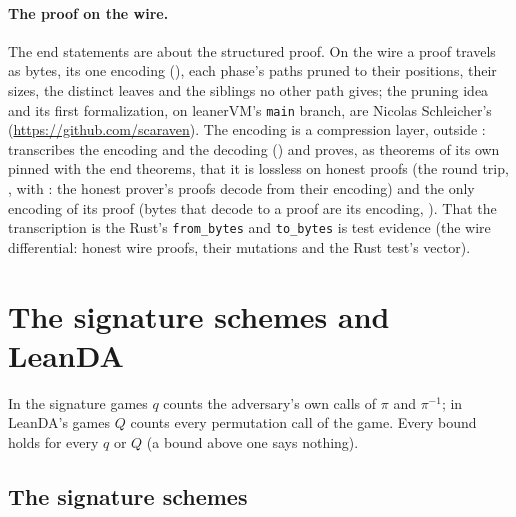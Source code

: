 \documentclass[11pt]{article}
\begin{document}
\paragraph{The proof on the wire.} The end statements are about the structured proof. On the wire
a proof travels as bytes, its one encoding (), each phase's
paths pruned to their positions, their sizes, the distinct leaves and the siblings no other path
gives; the pruning idea and its first formalization, on leanerVM's \texttt{main} branch, are
Nicolas Schleicher's (\url{https://github.com/scaraven}). The encoding is a compression layer, outside
:  transcribes the encoding and the decoding
() and proves, as theorems of its own pinned with the end
theorems, that it is lossless on honest proofs (the round trip, , with
: the honest prover's proofs decode from their
encoding) and the only encoding of its proof (bytes that decode to a proof are its encoding,
). That the transcription is the Rust's
\texttt{from\_bytes} and \texttt{to\_bytes} is test evidence (the wire differential: honest wire
proofs, their mutations and the Rust test's vector).

\section{The signature schemes and LeanDA}\label{sec:schemes}

In the signature games $q$ counts the adversary's own calls of $\pi$ and $\pi^{-1}$; in LeanDA's games
$Q$ counts every permutation call of the game. Every bound holds for every $q$ or $Q$ (a bound above
one says nothing).

\subsection*{The signature schemes}
\end{document}
